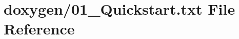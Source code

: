\hypertarget{01__Quickstart_8txt}{\section{doxygen/01\+\_\+\+Quickstart.txt File Reference}
\label{01__Quickstart_8txt}
}
